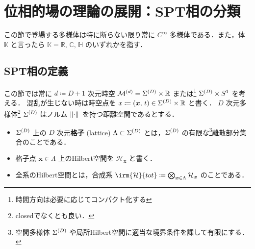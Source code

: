 \documentclass[TQFT_main]{subfiles}
\begin{document}
\setcounter{chapter}{3}

\chapter{位相的場の理論の展開：SPT相の分類}

この節で登場する多様体は特に断らない限り常に $C^\infty$ 多様体である．また，体 $\mathbb{K}$ と言ったら $\mathbb{K} = \mathbb{R},\, \mathbb{C},\, \mathbb{H}$ のいずれかを指す．

\section{SPT相の定義}

この節では常に $d \coloneqq D+1$ 次元時空 $\mathcal{M}^{(d)} = \Sigma^{(D)} \times \mathbb{R}$ または\footnote{時間方向は必要に応じてコンパクト化する} $\Sigma^{(D)} \times S^1$ を考える．
混乱が生じない時は時空点を $x \coloneqq (\bm{x},\, t) \in \Sigma^{(D)} \times \mathbb{R}$ と書く．
$D$ 次元多様体\footnote{closedでなくとも良い．} $\Sigma^{(D)}$ はノルム $\norm*{\cdot}$ を持つ距離空間であるとする．

\begin{itemize}
    \item $\Sigma^{(D)}$ 上の $D$ 次元\textbf{格子} (lattice) $\Lambda \subset \Sigma^{(D)}$ とは，$\Sigma^{(D)}$ の有限な\footnote{空間多様体 $\Sigma^{(D)}$ や局所Hilbert空間に適当な境界条件を課して有限にする．}離散部分集合のことである．
    \item 格子点 $\bm{x} \in \Lambda$ 上のHilbert空間を $\mathcal{H}_{\bm{x}}$ と書く．
    \item 全系のHilbert空間とは，合成系 $\irm{\mathcal{H}}{tot} \coloneqq \bigotimes_{\bm{x} \in \Lambda} \mathcal{H}_{\bm{x}}$ のことである．
\end{itemize}
\end{document}
